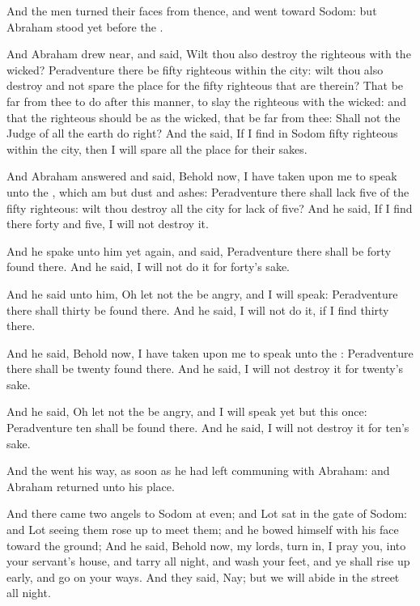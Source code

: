 \Verse And the men turned their faces from thence, and went toward Sodom: but Abraham stood yet before the \LORD.

\Verse And Abraham drew near, and said, Wilt thou also destroy the righteous with the wicked?  \Verse Peradventure there be fifty righteous within the city: wilt thou also destroy and not spare the place for the fifty righteous that are therein?  \Verse That be far from thee to do after this manner, to slay the righteous with the wicked: and that the righteous should be as the wicked, that be far from thee: Shall not the Judge of all the earth do right?  \Verse And the \LORD said, If I find in Sodom fifty righteous within the city, then I will spare all the place for their sakes.

\Verse And Abraham answered and said, Behold now, I have taken upon me to speak unto the \LORD, which am but dust and ashes: \Verse Peradventure there shall lack five of the fifty righteous: wilt thou destroy all the city for lack of five? And he said, If I find there forty and five, I will not destroy it.

\Verse And he spake unto him yet again, and said, Peradventure there shall be forty found there. And he said, I will not do it for forty's sake.

\Verse And he said unto him, Oh let not the \LORD be angry, and I will speak: Peradventure there shall thirty be found there. And he said, I will not do it, if I find thirty there.

\Verse And he said, Behold now, I have taken upon me to speak unto the \LORD: Peradventure there shall be twenty found there. And he said, I will not destroy it for twenty's sake.

\Verse And he said, Oh let not the \LORD be angry, and I will speak yet but this once: Peradventure ten shall be found there. And he said, I will not destroy it for ten's sake.

\Verse And the \LORD went his way, as soon as he had left communing with Abraham: and Abraham returned unto his place.

\Chapter
\Verse And there came two angels to Sodom at even; and Lot sat in the gate of Sodom: and Lot seeing them rose up to meet them; and he bowed himself with his face toward the ground; \Verse And he said, Behold now, my lords, turn in, I pray you, into your servant's house, and tarry all night, and wash your feet, and ye shall rise up early, and go on your ways. And they said, Nay; but we will abide in the street all night.


